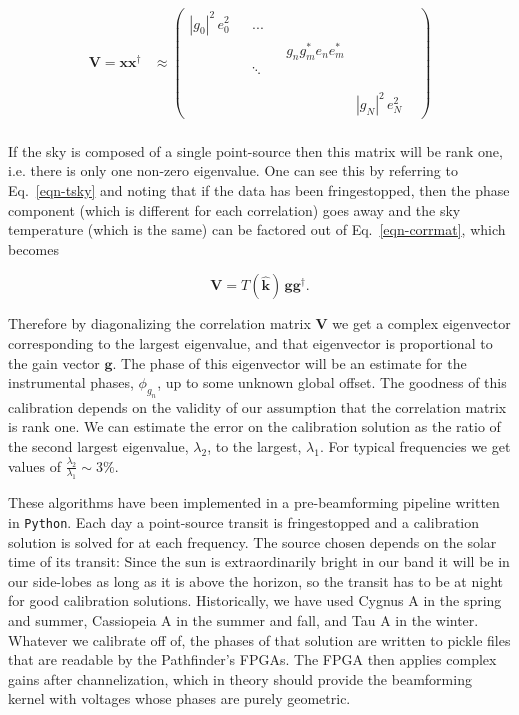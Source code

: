 \begin{align}
\label{eqn-corrmat}
\mathbf{V} = \mathbf{x} \mathbf{x}^\dagger &\approx \begin{pmatrix}
|g_0|^2\, e_0^2 &  & ... & & & \\ 
 &  &  & &  g_n g_m^* e_n e_m^*& \\ 
 &  &  \ddots & & & \\ 
 &  &  &  & & \\
&&&&&&\\
 &  &   &  & &  |g_N|^2 \, e_N^2
\end{pmatrix}
\end{align}
\\

If the sky is composed of a single point-source
then this matrix will be rank one, i.e. there is only one 
non-zero eigenvalue. One can see this by referring to Eq.~\ref{eqn-tsky} 
and noting that if the data has been fringestopped, then the phase 
component (which is different for each correlation) goes away and the 
sky temperature (which is the same) can be factored out of
Eq.~\ref{eqn-corrmat}, which becomes

\begin{equation}
\mathbf{V} = T(\mathbf{\hat{k}}) \, \mathbf{g} \mathbf{g}^\dagger.
\end{equation}

\noindent Therefore by diagonalizing the correlation matrix $\mathbf{V}$ 
we get a complex eigenvector corresponding to the largest 
eigenvalue, and that eigenvector is proportional to the gain vector $\mathbf{g}$. 
The phase of this eigenvector will be an estimate for the instrumental 
phases, $\phi_{g_n}$, up to some unknown global offset. The goodness 
of this calibration depends on the validity of our assumption 
that the correlation matrix is rank one. We can estimate the 
error on the calibration solution as the ratio of the second largest 
eigenvalue, $\lambda_2$, to the largest, $\lambda_1$. For typical 
frequencies we get values of $\frac{\lambda_2}{\lambda_1}\sim3\%$.

These algorithms have been implemented in a pre-beamforming 
pipeline written in {\tt Python}. Each day a point-source transit 
is fringestopped and a calibration solution is solved for at each frequency. 
The source chosen depends on the solar time of its transit: Since the
sun is extraordinarily bright in our band it will be in our side-lobes 
as long as it is above the horizon,
so the transit has to be 
at night for good calibration solutions. Historically, 
we have used Cygnus A in the spring and summer, Cassiopeia A 
in the summer and fall, and Tau A in the winter. 
Whatever we calibrate off of, the phases of that solution are 
written to pickle files that are readable by the Pathfinder's FPGAs.
The FPGA then applies complex gains after channelization, which 
in theory should provide the beamforming kernel with voltages 
whose phases are purely geometric. 

